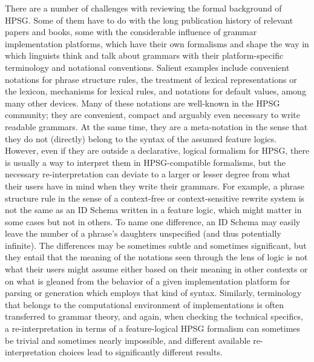 \documentclass[output=paper
 	        ,biblatex
                ,babelshorthands
                ,newtxmath
                ,draftmode
                ,colorlinks, citecolor=brown
]{langscibook}
\begin{document}
There are a number of challenges with reviewing the formal background
of HPSG. Some of them have to do with the long publication history of relevant papers and books, some
with the considerable influence of grammar implementation platforms, which have
their own formalisms and shape the way in which
linguists think and talk about grammars with their platform-specific terminology
and notational conventions. %
Salient examples include convenient
notations for phrase structure rules, the treatment of lexical
representations or the lexicon, mechanisms for lexical rules, and
notations for default values, among many other devices.  Many of these
notations are well-known in the HPSG community; they are convenient,
compact and arguably even necessary to write readable grammars. At
the same time, they are
a meta-notation in the sense that they
do not (directly) belong to the syntax of the assumed feature logics.
However, even if they are outside a declarative, logical formalism for HPSG,
there is usually a way to
interpret them in HPSG-compatible formalisms, but the necessary
re-interpretation can deviate to a larger or lesser degree from
what their users have in mind when they write their grammars. For example,
a phrase structure rule in the sense of a context-free or context-sensitive
rewrite system is not the same as an ID Schema written in a feature logic, which
might matter in some cases but not in others. To name one difference,
an ID Schema may easily leave the number of a phrase's daughters unspecified (and
thus potentially infinite).
The differences may be sometimes subtle and sometimes significant, but
they entail that the meaning of the notations seen through the lens
of logic is not what their users might assume either
based on their meaning in other contexts or on what is gleaned 
from the behavior
of a given implementation platform for parsing or generation which
employs that kind of syntax.
Similarly, terminology that belongs to the computational environment
of implementations is often transferred to grammar theory, and
again, when checking the technical specifics, a re-interpretation in terms of a feature-logical HPSG
formalism can sometimes be trivial and sometimes nearly impossible,
and different available re-interpretation choices
lead to significantly different results.
\end{document}
